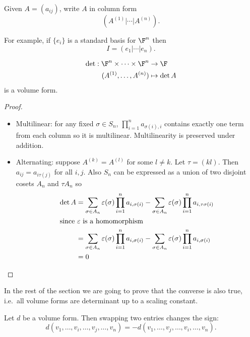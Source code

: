\documentclass[a4paper]{article}
\theoremstyle{definition}
\begin{document}
\begin{notation}
  Given \(A = (a_{ij})\), write \(A\) in column form
  \[
    \left( A^{(1)} | \cdots | A^{(n)} \right).
  \]
\end{notation}
For example, if \(\{e_i\}\) is a standard basis for \(\F^n\) then
\[
  I = \left(e_1 | \cdots | e_n \right).
\]

\begin{lemma}
  \begin{align*}
    \det: \F^n \times \dots \times \F^n &\to \F \\
    (A^{(1)}, \dots, A^{(n)}) &\mapsto \det A
  \end{align*}
  is a volume form.
\end{lemma}

\begin{proof}\leavevmode
  \begin{itemize}
  \item Multilinear: for any fixed \(\sigma \in S_n\), \(\prod_{i = 1}^n a_{\sigma(i), i}\) contains exactly one term from each column so it is multilinear. Multilinearity is preserved under addition.
  \item Alternating: suppose \(A^{(k)} = A^{(l)}\) for some \(l \neq k\). Let \(\tau = (kl)\). Then \(a_{ij} = a_{i \tau(j)}\) for all \(i, j\). Also \(S_n\) can be expressed as a union of two disjoint cosets \(A_n\) and \(\tau A_n\) so
    \begin{align*}
      \det A &= \sum_{\sigma \in A_n}^{ } \varepsilon(\sigma) \prod_{i = 1}^n a_{i, \sigma(i)} - \sum_{\sigma \in A_n}^{ } \varepsilon(\sigma) \prod_{i = 1}^n a_{i, \tau\sigma(i)} \\
      \intertext{since \(\varepsilon\) is a homomorphism}
             &= \sum_{\sigma \in A_n}^{ } \varepsilon(\sigma) \prod_{i = 1}^n a_{i, \sigma(i)} - \sum_{\sigma \in A_n}^{ } \varepsilon(\sigma) \prod_{i = 1}^n a_{i, \sigma(i)} \\
             &= 0
    \end{align*}
  \end{itemize}
\end{proof}

In the rest of the section we are going to prove that the converse is also true, i.e.\ all volume forms are determinant up to a scaling constant.

\begin{lemma}
  Let \(d\) be a volume form. Then swapping two entries changes the sign:
  \[
    d(v_1, \dots, v_i, \dots, v_j, \dots, v_n) = - d(v_1, \dots, v_j, \dots, v_i, \dots, v_n).
  \]
\end{lemma}
\end{document}

